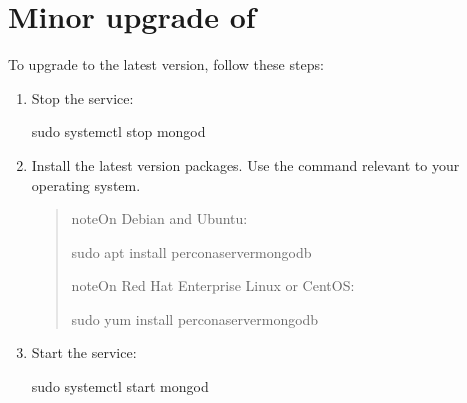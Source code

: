 \documentclass[letterpaper,10pt,english]{sphinxmanual}
\begin{document}
\section{Minor upgrade of }
\label{\detokenize{install/upgrade-from-mongodb:minor-upgrade-of-psmdb}}\label{\detokenize{install/upgrade-from-mongodb:minor-upgrade}}
\sphinxAtStartPar
To upgrade  to the latest version, follow these steps:
\begin{enumerate}
%
\item {} 
\sphinxAtStartPar
Stop the  service:

\begin{sphinxVerbatim}[commandchars=\\\{\}]
\PYGZdl{} sudo systemctl stop mongod
\end{sphinxVerbatim}

\item {} 
\sphinxAtStartPar
Install the latest version packages. Use the command relevant to your operating system.
\begin{quote}

\begin{sphinxadmonition}{note}{On Debian and Ubuntu:}

\begin{sphinxVerbatim}[commandchars=\\\{\}]
\PYGZdl{} sudo apt install percona\PYGZhy{}server\PYGZhy{}mongodb
\end{sphinxVerbatim}
\end{sphinxadmonition}

\begin{sphinxadmonition}{note}{On Red Hat Enterprise Linux or CentOS:}

\begin{sphinxVerbatim}[commandchars=\\\{\}]
\PYGZdl{} sudo yum install percona\PYGZhy{}server\PYGZhy{}mongodb
\end{sphinxVerbatim}
\end{sphinxadmonition}
\end{quote}

\item {} 
\sphinxAtStartPar
Start the  service:

\begin{sphinxVerbatim}[commandchars=\\\{\}]
\PYGZdl{} sudo systemctl start mongod
\end{sphinxVerbatim}

\end{enumerate}
\end{document}
